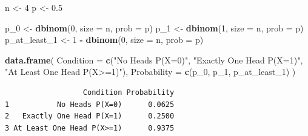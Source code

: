 \documentclass[
]{article}
\newenvironment{Shaded}{\begin{snugshade}}{\end{snugshade}}
\newcommand{\AttributeTok}[1]{\textcolor[rgb]{0.13,0.29,0.53}{#1}}
\newcommand{\DecValTok}[1]{\textcolor[rgb]{0.00,0.00,0.81}{#1}}
\newcommand{\FloatTok}[1]{\textcolor[rgb]{0.00,0.00,0.81}{#1}}
\newcommand{\FunctionTok}[1]{\textcolor[rgb]{0.13,0.29,0.53}{\textbf{#1}}}
\newcommand{\NormalTok}[1]{#1}
\newcommand{\OtherTok}[1]{\textcolor[rgb]{0.56,0.35,0.01}{#1}}
\newcommand{\SpecialCharTok}[1]{\textcolor[rgb]{0.81,0.36,0.00}{\textbf{#1}}}
\newcommand{\StringTok}[1]{\textcolor[rgb]{0.31,0.60,0.02}{#1}}
\begin{document}
\begin{Shaded}
\begin{Highlighting}[]
\NormalTok{n }\OtherTok{\textless{}{-}} \DecValTok{4}
\NormalTok{p }\OtherTok{\textless{}{-}} \FloatTok{0.5}

\NormalTok{p\_0 }\OtherTok{\textless{}{-}} \FunctionTok{dbinom}\NormalTok{(}\DecValTok{0}\NormalTok{, }\AttributeTok{size =}\NormalTok{ n, }\AttributeTok{prob =}\NormalTok{ p)}
\NormalTok{p\_1 }\OtherTok{\textless{}{-}} \FunctionTok{dbinom}\NormalTok{(}\DecValTok{1}\NormalTok{, }\AttributeTok{size =}\NormalTok{ n, }\AttributeTok{prob =}\NormalTok{ p)}
\NormalTok{p\_at\_least\_1 }\OtherTok{\textless{}{-}} \DecValTok{1} \SpecialCharTok{{-}} \FunctionTok{dbinom}\NormalTok{(}\DecValTok{0}\NormalTok{, }\AttributeTok{size =}\NormalTok{ n, }\AttributeTok{prob =}\NormalTok{ p)}

\FunctionTok{data.frame}\NormalTok{(}
  \AttributeTok{Condition =} \FunctionTok{c}\NormalTok{(}\StringTok{"No Heads P(X=0)"}\NormalTok{, }\StringTok{"Exactly One Head P(X=1)"}\NormalTok{, }\StringTok{"At Least One Head P(X\textgreater{}=1)"}\NormalTok{),}
  \AttributeTok{Probability =} \FunctionTok{c}\NormalTok{(p\_0, p\_1, p\_at\_least\_1)}
\NormalTok{)}
\end{Highlighting}
\end{Shaded}

\begin{verbatim}
                  Condition Probability
1           No Heads P(X=0)      0.0625
2   Exactly One Head P(X=1)      0.2500
3 At Least One Head P(X>=1)      0.9375
\end{verbatim}
\end{document}
